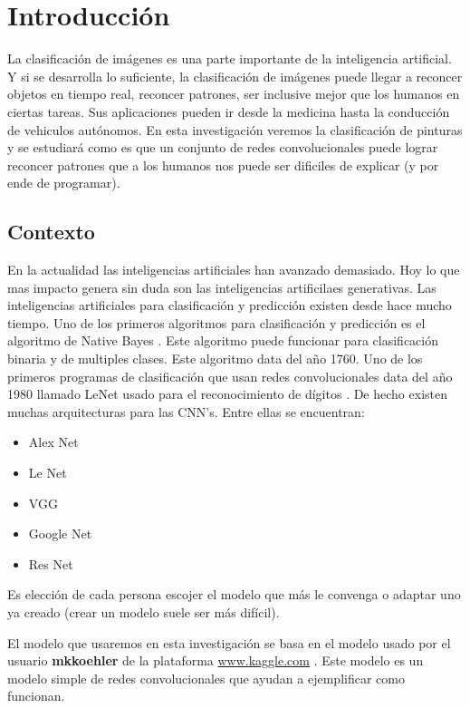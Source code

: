 \documentclass[../main.tex]{subfiles}
\begin{document}
\section{Introducción}

La clasificación de imágenes es una parte importante de la inteligencia artificial. Y si se desarrolla lo suficiente, la clasificación de imágenes puede llegar a reconcer objetos en tiempo real, reconcer patrones, ser inclusive mejor que los humanos en ciertas tareas. Sus aplicaciones pueden ir desde la medicina hasta la conducción de vehiculos autónomos. En esta investigación veremos la clasificación de pinturas y se estudiará como es que un conjunto de redes convolucionales puede lograr reconcer patrones que a los humanos nos puede ser dificiles de explicar (y por ende de programar).

\subsection{Contexto}

En la actualidad las inteligencias artificiales han avanzado demasiado. Hoy lo que mas impacto genera sin duda son las inteligencias artificilaes generativas. Las inteligencias artificiales para clasificación y predicción existen desde hace mucho tiempo. Uno de los primeros algoritmos para clasificación y predicción es  el algoritmo de Native Bayes \cite{webb2010naive}. Este algoritmo puede funcionar para clasificación binaria y de multiples clases. Este algoritmo data del año 1760. Uno de los primeros programas de clasificación que usan redes convolucionales data del año 1980 llamado LeNet usado para el reconocimiento de dígitos \cite{kayed2020classification}. De hecho existen muchas arquitecturas para las CNN's\cite{swapna2020cnn}. Entre ellas se encuentran:

\begin{itemize}
    \item Alex Net
    \item Le Net
    \item VGG
    \item Google Net
    \item Res Net
\end{itemize}

Es elección de cada persona escojer el modelo que más le convenga o adaptar uno ya creado (crear un modelo suele ser más difícil).

El modelo que usaremos en esta investigación se basa en el modelo usado por el usuario \textbf{mkkoehler} de la plataforma \url{www.kaggle.com} \cite{Mkkoehler_2020}. Este modelo es un modelo simple de redes convolucionales que ayudan a ejemplificar como funcionan. 
\end{document}
